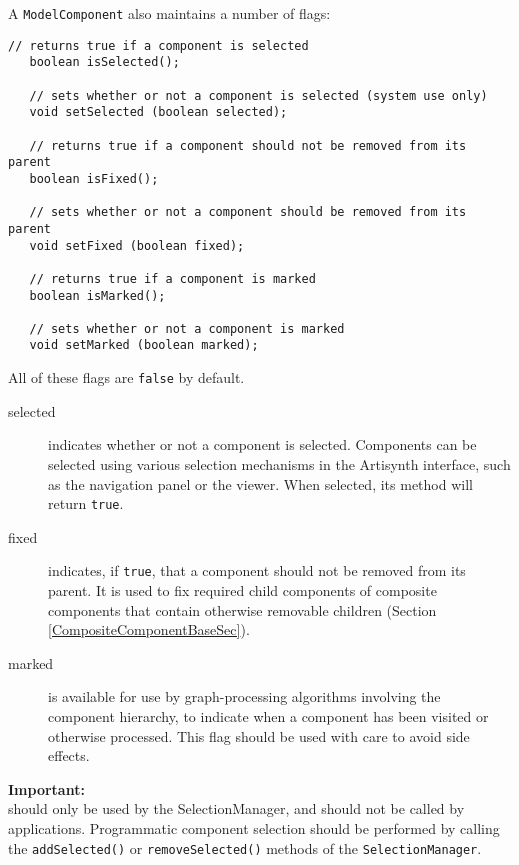 \documentclass{article}
\begin{document}
A {\tt ModelComponent} also maintains a number of flags:
\begin{lstlisting}[]
   // returns true if a component is selected
   boolean isSelected();

   // sets whether or not a component is selected (system use only)
   void setSelected (boolean selected);

   // returns true if a component should not be removed from its parent
   boolean isFixed();

   // sets whether or not a component should be removed from its parent
   void setFixed (boolean fixed);

   // returns true if a component is marked
   boolean isMarked();

   // sets whether or not a component is marked
   void setMarked (boolean marked);
\end{lstlisting}

All of these flags are {\tt false} by default.

\begin{description}

\item [selected] indicates whether or not a component is selected.
Components can be selected using various selection mechanisms in the
Artisynth interface, such as the navigation panel or the viewer.  When
selected, its
method will return {\tt true}.

\item [fixed] indicates, if {\tt true}, that a component should
not be removed from its parent. It is used to fix required child
components of composite components that contain otherwise removable
children (Section \ref{CompositeComponentBaseSec}).

\item [marked] is available for use by graph-processing
algorithms involving the component hierarchy, to indicate when a
component has been visited or otherwise processed. This flag should be
used with care to avoid side effects.

\end{description}

\begin{sideblock}
{\bf Important:}\\
should only be used by the SelectionManager, and should not be called
by applications. Programmatic component selection should be performed
by calling the {\tt addSelected()} or {\tt removeSelected()} methods
of the {\tt SelectionManager}.
\end{sideblock}
\end{document}
